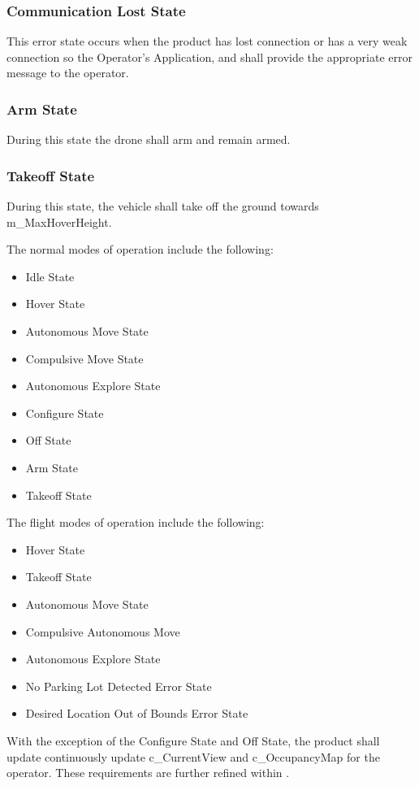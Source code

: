 \documentclass{article}
\begin{document}
\subsubsection{Communication Lost State}
\label{Communication Lost State}
This error state occurs when the product has lost connection or has a very weak connection so the Operator's Application, and shall provide the appropriate error message to the operator.
\subsubsection{Arm State}
\label{Arm State}
During this state the drone shall arm and remain armed.
\subsubsection{Takeoff State}
\label{Takeoff State}
During this state, the vehicle shall take off the ground towards m\_MaxHoverHeight.

The normal modes of operation include the following:
\begin{itemize}
  \item Idle State
  \item Hover State
  \item Autonomous Move State
  \item Compulsive Move State
  \item Autonomous Explore State
  \item Configure State
  \item Off State
  \item Arm State
  \item Takeoff State
\end{itemize}
The flight modes of operation \label{flightModes} include the following:
\begin{itemize}
  \item Hover State
  \item Takeoff State
  \item Autonomous Move State
  \item Compulsive Autonomous Move
  \item Autonomous Explore State
   \item No Parking Lot Detected Error State
   \item Desired Location Out of Bounds Error State
\end{itemize}
With the exception of the Configure State and Off State, the product shall update continuously update c\_CurrentView and c\_OccupancyMap for the operator. These requirements are further refined within . 
\end{document}
